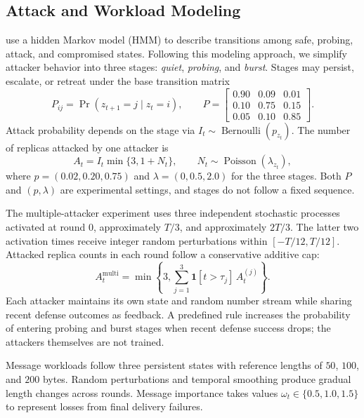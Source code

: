 \documentclass{article}
\begin{document}
\subsection{Attack and Workload Modeling}
\citet{liao2020network} use a hidden Markov model ({HMM}) to describe transitions among safe, probing, attack, and compromised states. Following this modeling approach, we simplify attacker behavior into three stages: \emph{quiet}, \emph{probing}, and \emph{burst}. Stages may persist, escalate, or retreat under the base transition matrix
\[
P_{ij} = \Pr(z_{t+1} = j \mid z_t = i), \qquad
P = \begin{bmatrix}
0.90 & 0.09 & 0.01 \\
0.10 & 0.75 & 0.15 \\
0.05 & 0.10 & 0.85
\end{bmatrix}.
\]
Attack probability depends on the stage via $I_t \sim \operatorname{Bernoulli}(p_{z_t})$. The number of replicas attacked by one attacker is
\[
A_t = I_t \min\{3, 1 + N_t\}, \qquad N_t \sim \operatorname{Poisson}(\lambda_{z_t}),
\]
where $p = (0.02, 0.20, 0.75)$ and $\lambda = (0, 0.5, 2.0)$ for the three stages. Both $P$ and $(p, \lambda)$ are experimental settings, and stages do not follow a fixed sequence.

The multiple-attacker experiment uses three independent stochastic processes activated at round $0$, approximately $T/3$, and approximately $2T/3$. The latter two activation times receive integer random perturbations within $[-T/12, T/12]$. Attacked replica counts in each round follow a conservative additive cap:
\[
A_t^{\mathrm{multi}} = \min\left\{3, \sum_{j=1}^{3} \mathbf{1}[t > \tau_j]\, A_t^{(j)}\right\}.
\]
Each attacker maintains its own state and random number stream while sharing recent defense outcomes as feedback. A predefined rule increases the probability of entering probing and burst stages when recent defense success drops; the attackers themselves are not trained.

Message workloads follow three persistent states with reference lengths of $50$, $100$, and $200$ bytes. Random perturbations and temporal smoothing produce gradual length changes across rounds. Message importance takes values $\omega_t \in \{0.5, 1.0, 1.5\}$ to represent losses from final delivery failures.
\end{document}
